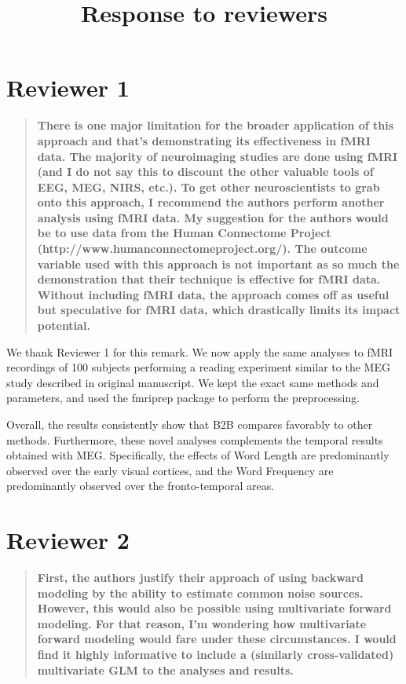 \documentclass[preprint,12pt,3p]{elsarticle}
\begin{document}
\title{Response to reviewers}


\section{Reviewer 1}
\begin{quote}\textbf{
    There is one major limitation for the broader application of this approach and
    that's demonstrating its effectiveness in fMRI data. The majority of
    neuroimaging studies are done using fMRI (and I do not say this to discount the
    other valuable tools of EEG, MEG, NIRS, etc.). To get other neuroscientists to
    grab onto this approach, I recommend the authors perform another analysis using
    fMRI data. My suggestion for the authors would be to use data from the Human
    Connectome Project (http://www.humanconnectomeproject.org/). The outcome
    variable used with this approach is not important as so much the demonstration
    that their technique is effective for fMRI data. Without including fMRI data,
    the approach comes off as useful but speculative for fMRI data, which
    drastically limits its impact potential.
}
\end{quote}

We thank Reviewer 1 for this remark. We now apply the same analyses to
fMRI recordings of 100 subjects performing a reading experiment similar to the
MEG study described in original manuscript. We kept the exact same methods and parameters, and
used the fmriprep package to perform the preprocessing.

Overall, the results consistently show that B2B compares favorably to other methods.
Furthermore, these novel analyses complements the temporal results obtained with
MEG. Specifically, the effects of Word Length are predominantly observed over the early visual
cortices, and the Word Frequency are predominantly observed over the fronto-temporal areas.

\section{Reviewer 2}
\begin{quote}\textbf{
    First, the authors justify their approach of using backward modeling by the
    ability to estimate common noise sources. However, this would also be possible
    using multivariate forward modeling. For that reason, I'm wondering how
    multivariate forward modeling would fare under these circumstances. I would find
    it highly informative to include a (similarly cross-validated) multivariate GLM
    to the analyses and results.
}
\end{quote}
\end{document}

